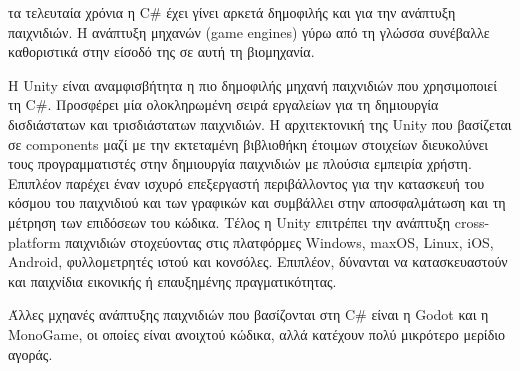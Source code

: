τα τελευταία χρόνια η C\# έχει γίνει αρκετά δημοφιλής και για την ανάπτυξη παιχνιδιών. Η ανάπτυξη 
μηχανών (game engines) γύρω από τη γλώσσα συνέβαλλε καθοριστικά στην είσοδό της σε αυτή τη βιομηχανία.
 
Η Unity είναι αναμφισβήτητα η πιο δημοφιλής μηχανή παιχνιδιών που χρησιμοποιεί τη C\#. Προσφέρει μία 
ολοκληρωμένη σειρά εργαλείων για τη δημιουργία δισδιάστατων και τρισδιάστατων παιχνιδιών. Η αρχιτεκτονική 
της Unity που βασίζεται σε components μαζί με την εκτεταμένη βιβλιοθήκη έτοιμων στοιχείων διευκολύνει
τους προγραμματιστές στην δημιουργία παιχνιδιών με πλούσια εμπειρία χρήστη. Επιπλέον παρέχει έναν ισχυρό
επεξεργαστή περιβάλλοντος για την κατασκευή του κόσμου του παιχνιδιού και των γραφικών και συμβάλλει στην
αποσφαλμάτωση και τη μέτρηση των επιδόσεων του κώδικα. Τέλος η Unity επιτρέπει την ανάπτυξη cross-platform 
παιχνιδιών στοχεύοντας στις πλατφόρμες Windows, maxOS, Linux, iOS, Android, φυλλομετρητές ιστού και κονσόλες.
Επιπλέον, δύνανται να κατασκευαστούν και παιχνίδια εικονικής ή επαυξημένης πραγματικότητας.

Άλλες μχηανές ανάπτυξης παιχνιδιών που βασίζονται στη C\# είναι η Godot και η MonoGame, 
οι οποίες είναι ανοιχτού κώδικα, αλλά κατέχουν πολύ μικρότερο μερίδιο αγοράς.
